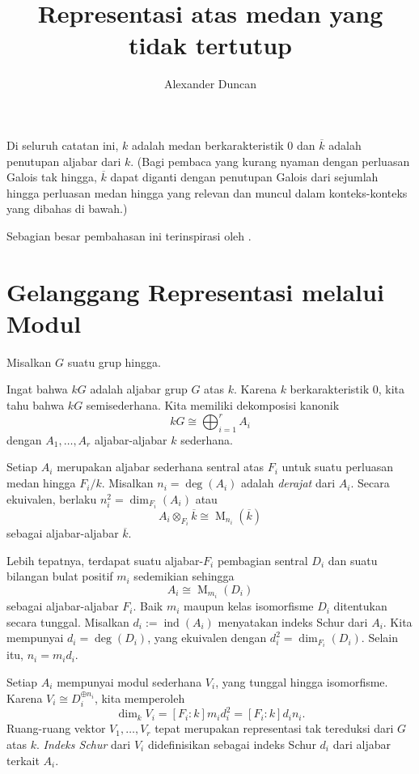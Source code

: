 \documentclass[12pt]{article}
\theoremstyle{plain}
\theoremstyle{definition}
\theoremstyle{remark}
\numberwithin{equation}{section}
\begin{document}
\title{Representasi atas medan yang tidak tertutup}
\author{Alexander Duncan}

\maketitle

Di seluruh catatan ini, $k$ adalah medan berkarakteristik $0$
dan $\overline{k}$ adalah penutupan aljabar dari $k$.
(Bagi pembaca yang kurang nyaman dengan perluasan Galois tak hingga,
$\overline{k}$ dapat diganti dengan penutupan Galois
dari sejumlah hingga perluasan medan hingga yang relevan
dan muncul dalam konteks-konteks yang dibahas di bawah.)

Sebagian besar pembahasan ini terinspirasi oleh \cite[\S{12--13}]{Serre}.

\section{Gelanggang Representasi melalui Modul}

Misalkan $G$ suatu grup hingga.

Ingat bahwa $kG$ adalah aljabar grup $G$ atas $k$.
Karena $k$ berkarakteristik $0$, kita tahu bahwa $kG$ semisederhana.
Kita memiliki dekomposisi kanonik
\[
kG \cong \bigoplus_{i=1}^r A_i
\]
dengan $A_1,\ldots,A_r$ aljabar-aljabar $k$ sederhana.

Setiap $A_i$ merupakan aljabar sederhana sentral atas $F_i$
untuk suatu perluasan medan hingga $F_i/k$.
Misalkan $n_i = \deg(A_i)$ adalah \emph{derajat} dari $A_i$.
Secara ekuivalen, berlaku $n_i^2 = \dim_{F_i}(A_i)$
atau
\[
A_i \otimes_{F_i} \overline{k} \cong
\operatorname{M}_{n_i}(\overline{k})
\]
sebagai aljabar-aljabar $\overline{k}$.

Lebih tepatnya, terdapat suatu aljabar-$F_i$ pembagian sentral $D_i$
dan suatu bilangan bulat positif $m_i$ sedemikian sehingga
\[
A_i \cong \operatorname{M}_{m_i}(D_i)
\]
sebagai aljabar-aljabar $F_i$.
Baik $m_i$ maupun kelas isomorfisme $D_i$ ditentukan secara tunggal.
Misalkan $d_i := \operatorname{ind}(A_i)$ menyatakan indeks Schur dari $A_i$.
Kita mempunyai $d_i = \deg(D_i)$, yang ekuivalen dengan
$d_i^2=\dim_{F_i}(D_i)$.  Selain itu, $n_i=m_id_i$.

Setiap $A_i$ mempunyai modul sederhana $V_i$, yang tunggal hingga isomorfisme.
Karena $V_i \cong D_i^{\oplus n_i}$, kita memperoleh
\[
\dim_k V_i = [F_i:k]m_id_i^2 = [F_i:k]d_in_i .
\]
Ruang-ruang vektor $V_1,\ldots,V_r$ tepat merupakan
representasi tak tereduksi dari $G$ atas $k$.
\emph{Indeks Schur} dari $V_i$ didefinisikan sebagai
indeks Schur $d_i$ dari aljabar terkait $A_i$.
\end{document}

